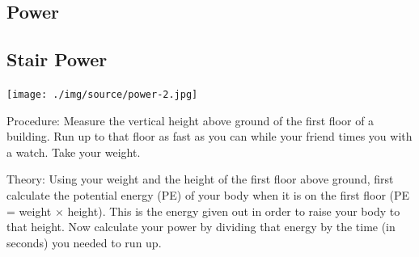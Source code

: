 \begin{multicols}{2}

\section*{Power}


\subsection{Stair Power}

\begin{center}
\texttt{[image: ./img/source/power-2.jpg]}
\end{center}

\begin{description*}
\item[Procedure:]{Measure the vertical height above ground of the first floor of a building. Run up to
that floor as fast as you can while your friend times you with a watch. Take your weight.}
\item[Theory:]{Using your weight and the height of the first floor above ground, first calculate the potential
energy (PE) of your body when it is on the first floor (PE = weight $\times$ height). This is the energy given out in order to raise your body to that height.
Now calculate your power by dividing that energy by the time (in seconds) you needed to
run up.}
\end{description*}


%
%


\end{multicols}
